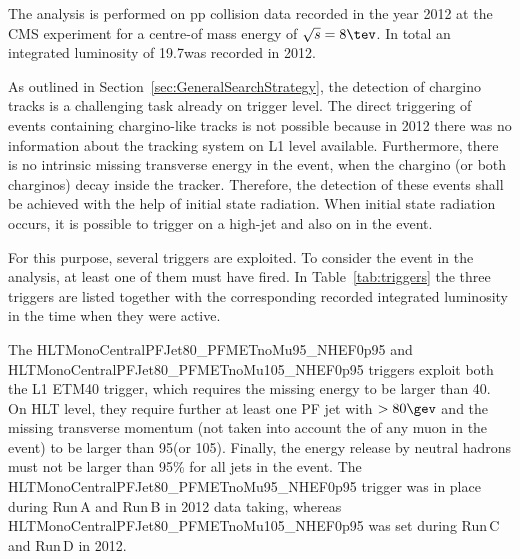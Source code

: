 The analysis is performed on pp collision data recorded in the year 2012 at the CMS experiment for a centre-of mass energy of $\sqrt{s}=8\tev$.
In total an integrated luminosity of 19.7\fbinv was recorded in 2012.

As outlined in Section~\ref{sec:GeneralSearchStrategy}, the detection of chargino tracks is a challenging task already on trigger level.
The direct triggering of events containing chargino-like tracks is not possible because in 2012 there was no information about the tracking system on L1 level available.
Furthermore, there is no intrinsic missing transverse energy in the event, when the chargino (or both charginos) decay inside the tracker.
Therefore, the detection of these events shall be achieved with the help of initial state radiation.
When initial state radiation occurs, it is possible to trigger on a high-\pt jet and also on \met in the event.

For this purpose, several triggers are exploited.
To consider the event in the analysis, at least one of them must have fired.
In Table~\ref{tab:triggers} the three triggers are listed together with the corresponding recorded integrated luminosity in the time when they were active.
\renewcommand{\arraystretch}{1.5}
\begin{table}[!hbt]
\centering
\caption{\met and \met+ jet triggers used in the analysis together with the corresponding recorded integrated luminosity in the time when they were in place.}
\label{tab:triggers}
\end{table}  

The HLTMonoCentralPFJet80\_PFMETnoMu95\_NHEF0p95 and HLTMonoCentralPFJet80\_PFMETnoMu105\_NHEF0p95 triggers exploit both the L1 ETM40 trigger, which requires the missing energy to be larger than 40\gev.
On HLT level, they require further at least one PF jet with \pt$>80\gev$ and the missing transverse momentum \met (not taken into account the \pt of any muon in the event) to be larger than 95\gev (or 105\gev).
Finally, the energy release by neutral hadrons must not be larger than 95\% for all jets in the event.
The HLTMonoCentralPFJet80\_PFMETnoMu95\_NHEF0p95 trigger was in place during Run\,A and Run\,B in 2012 data taking, whereas HLTMonoCentralPFJet80\_PFMETnoMu105\_NHEF0p95 was set during Run\,C and Run\,D in 2012.

